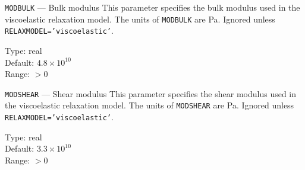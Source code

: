 \begin{keydescription}{\texttt{MODBULK} --- Bulk modulus}
%
  This parameter specifies the bulk modulus used in the 
  viscoelastic relaxation model. The units of \texttt{MODBULK} are Pa.
  Ignored unless \texttt{RELAXMODEL='viscoelastic'}.
  \begin{keytab}
    Type:    \> real \\
    Default: \> $4.8 \times 10^{10}$ \\
    Range:   \> $>0$
  \end{keytab}
\end{keydescription}

\begin{keydescription}{\texttt{MODSHEAR} --- Shear modulus}
%
  This parameter specifies the shear modulus used in the 
  viscoelastic relaxation model. The units of \texttt{MODSHEAR} are Pa.
  Ignored unless \texttt{RELAXMODEL='viscoelastic'}.
  \begin{keytab}
    Type:    \> real \\
    Default: \> $3.3 \times 10^{10}$ \\
    Range:   \> $>0$
  \end{keytab}
\end{keydescription}

